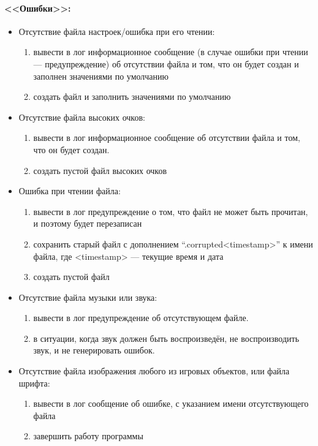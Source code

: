 \documentclass[12pt,a4paper,fullpage,titlepage]{article}
\begin{document}
\paragraph{<<Ошибки>>:}
\begin{itemize}
	\item Отсутствие файла настроек/ошибка при его чтении:
	\begin{enumerate}
		\item вывести в лог информационное сообщение (в случае ошибки при чтении --- предупреждение) об отсутствии файла и том, что он будет создан и заполнен значениями по умолчанию
		\item создать файл и заполнить значениями по умолчанию
	\end{enumerate}
	\item Отсутствие файла высоких очков:
	\begin{enumerate}
		\item вывести в лог информационное сообщение об отсутствии файла и том, что он будет создан.
		\item создать пустой файл высоких очков
	\end{enumerate}
	\item Ошибка при чтении файла:
	\begin{enumerate}
		\item вывести в лог предупреждение о том, что файл не может быть прочитан, и поэтому будет перезаписан
		\item сохранить старый файл с дополнением ``.corrupted<timestamp>'' к имени файла, где <timestamp> --- текущие время и дата
		\item создать пустой файл
	\end{enumerate}
	\item Отсутствие файла музыки или звука:
	\begin{enumerate}
		\item вывести в лог предупреждение об отсутствующем файле.
		\item в ситуации, когда звук должен быть воспроизведён, не воспроизводить звук, и не генерировать ошибок.
	\end{enumerate}
	\item Отсутствие файла изображения любого из игровых объектов, или файла шрифта:
	\begin{enumerate}
		\item вывести в лог сообщение об ошибке, с указанием имени отсутствующего файла
		\item завершить работу программы
	\end{enumerate}
\end{itemize}
\end{document}

